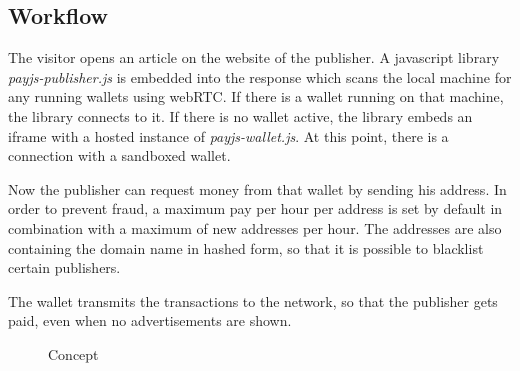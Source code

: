 \documentclass[a4paper]{article}
\begin{document}
\newpage
\subsection{Workflow}
The visitor opens an article on the website of the publisher. A javascript library \textit{payjs-publisher.js} is embedded into the response which scans the local machine for any running wallets using webRTC. If there is a wallet running on that machine, the library connects to it. If there is no wallet active, the library embeds an iframe with a hosted instance of \textit{payjs-wallet.js}. At this point, there is a connection with a sandboxed wallet.

Now the publisher can request money from that wallet by sending his address. In order to prevent fraud, a maximum pay per hour per address is set by default in combination with a maximum of new addresses per hour. The addresses are also containing the domain name in hashed form, so that it is possible to blacklist certain publishers.

The wallet transmits the transactions to the network, so that the publisher gets paid, even when no advertisements are shown.



\begin{figure}[htbp]
	
	\caption{Concept}
\end{figure}
\end{document}
